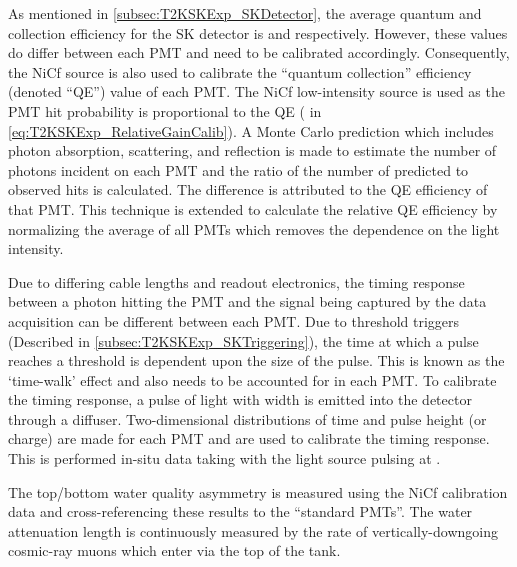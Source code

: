 As mentioned in \autoref{subsec:T2KSKExp_SKDetector}, the average quantum and collection efficiency for the SK detector is  and  respectively. However, these values do differ between each PMT and need to be calibrated accordingly. Consequently, the NiCf source is also used to calibrate the ``quantum \quickmath{\times} collection'' efficiency (denoted ``QE'') value of each PMT.
The NiCf low-intensity source is used as the PMT hit probability is proportional to the QE ( in \autoref{eq:T2KSKExp_RelativeGainCalib}). A Monte Carlo prediction which includes photon absorption, scattering, and reflection is made to estimate the number of photons incident on each PMT and the ratio of the number of predicted to observed hits is calculated. The difference is attributed to the QE efficiency of that PMT. This technique is extended to calculate the relative QE efficiency by normalizing the average of all PMTs which removes the dependence on the light intensity.

Due to differing cable lengths and readout electronics, the timing response between a photon hitting the PMT and the signal being captured by the data acquisition can be different between each PMT. Due to threshold triggers (Described in \autoref{subsec:T2KSKExp_SKTriggering}), the time at which a pulse reaches a threshold is dependent upon the size of the pulse. This is known as the `time-walk' effect and also needs to be accounted for in each PMT. To calibrate the timing response, a pulse of light with width  is emitted into the detector through a diffuser. Two-dimensional distributions of time and pulse height (or charge) are made for each PMT and are used to calibrate the timing response. This is performed in-situ   data taking with the light source pulsing at .

The top/bottom water quality asymmetry is measured using the NiCf calibration data and cross-referencing these results to the ``standard PMTs''. The water attenuation length is continuously measured by the rate of vertically-downgoing cosmic-ray muons which enter via the top of the tank.

